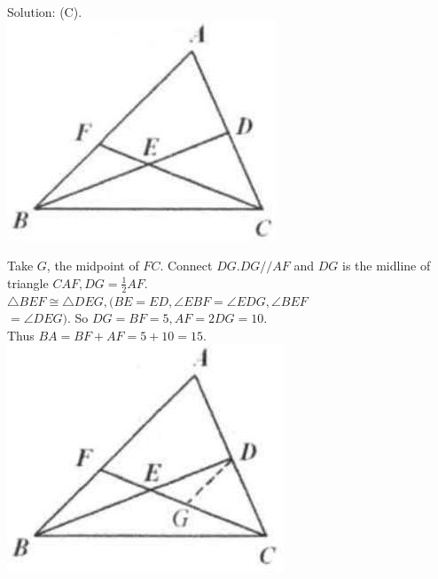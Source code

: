 \documentclass[10pt]{article}
\begin{document}
Solution: (C).\\
\includegraphics[max width=\textwidth, center]{2025_04_17_97bc1f7e44d93c271a88g-035(1)}

Take \(G\), the midpoint of \(F C\). Connect \(D G . D G / / A F\) and \(D G\) is the midline of triangle \(C A F, D G=\frac{1}{2} A F\).\\
\(\triangle B E F \cong \triangle D E G,(B E=E D, \angle E B F=\angle E D G, \angle B E F\)\\
\(=\angle D E G)\). So \(D G=B F=5, A F=2 D G=10\).\\
Thus \(B A=B F+A F=5+10=15\).\\
\includegraphics[max width=\textwidth, center]{2025_04_17_97bc1f7e44d93c271a88g-035(2)}
\end{document}
